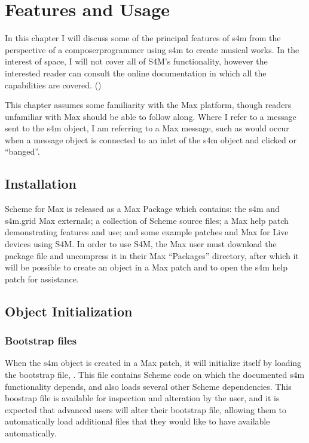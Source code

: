 \documentclass[letterpaper,10pt,english]{sphinxmanual}
\begin{document}
\chapter{Features and Usage}
\label{\detokenize{features_usage:features-and-usage}}\label{\detokenize{features_usage::doc}}
\sphinxAtStartPar
In this chapter I will discuss some of the principal features of s4m from the perspective of a composer\sphinxhyphen{}programmer
using s4m to create musical works.
In the interest of space, I will not cover all of S4M’s functionality, however the interested
reader can consult the online documentation in which all the capabilities are covered.
()

\sphinxAtStartPar
This chapter assumes some familiarity with the Max platform, though readers unfamiliar with Max should be able to follow along.
Where I refer to a message sent to the s4m object, I am referring to a Max message, such as would occur
when a message object is connected to an inlet of the s4m object and clicked or “banged”.


\section{Installation}
\label{\detokenize{features_usage:installation}}
\sphinxAtStartPar
Scheme for Max is released as a Max Package which contains: the s4m and s4m.grid Max externals;
a collection of Scheme source files; a Max help patch demonstrating features and use;
and some example patches and Max for Live devices using S4M.
In order to use S4M, the Max user must download the package file and uncompress it in their Max
“Packages” directory, after which it will be possible to create an  object in a Max patch
and to open the s4m help patch for assistance.


\section{Object Initialization}
\label{\detokenize{features_usage:object-initialization}}

\subsection{Bootstrap files}
\label{\detokenize{features_usage:bootstrap-files}}
\sphinxAtStartPar
When the s4m object is created in a Max patch, it will initialize itself by loading the bootstrap file, .
This file contains Scheme code on which the documented s4m functionality depends, and also loads several other Scheme dependencies.
This boostrap file is available for inspection and alteration by the user, and it is expected that advanced users will
alter their bootstrap file, allowing them to automatically load additional files that they would like to have available automatically.
\end{document}
